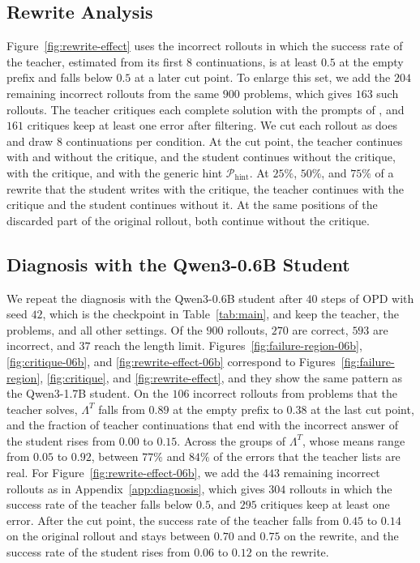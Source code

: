 \subsection{Rewrite Analysis}
\label{app:rewrite-analysis}

Figure~\ref{fig:rewrite-effect} uses the incorrect rollouts in which the success
rate of the teacher, estimated from its first $8$ continuations, is at least
$0.5$ at the empty prefix and falls below $0.5$ at a later cut point.
To enlarge this set, we add the $204$ remaining incorrect rollouts from the same
$900$ problems, which gives $163$ such rollouts.
The teacher critiques each complete solution with the prompts of \ours{}, and
$161$ critiques keep at least one error after filtering.
We cut each rollout as \ours{} does and draw $8$ continuations per condition.
At the cut point, the teacher continues with and without the critique, and the
student continues without the critique, with the critique, and with the generic
hint $\mathcal{P}_{\text{hint}}$.
At $25\%$, $50\%$, and $75\%$ of a rewrite that the student writes with the
critique, the teacher continues with the critique and the student continues
without it.
At the same positions of the discarded part of the original rollout, both
continue without the critique.

\subsection{Diagnosis with the Qwen3-0.6B Student}
\label{app:diag-06b}

We repeat the diagnosis with the Qwen3-0.6B student after $40$ steps of OPD
with seed $42$, which is the checkpoint in Table~\ref{tab:main}, and keep the
teacher, the problems, and all other settings.
Of the $900$ rollouts, $270$ are correct, $593$ are incorrect, and $37$ reach the
length limit.
Figures~\ref{fig:failure-region-06b}, \ref{fig:critique-06b}, and
\ref{fig:rewrite-effect-06b} correspond to Figures~\ref{fig:failure-region},
\ref{fig:critique}, and \ref{fig:rewrite-effect}, and they show the same
pattern as the Qwen3-1.7B student.
On the $106$ incorrect rollouts from problems that the teacher solves,
$\Lambda^T$ falls from $0.89$ at the empty prefix to $0.38$ at the last cut
point, and the fraction of teacher continuations that end with the incorrect
answer of the student rises from $0.00$ to $0.15$.
Across the groups of $\Lambda^T$, whose means range from $0.05$ to $0.92$,
between $77\%$ and $84\%$ of the errors that the teacher lists are real.
For Figure~\ref{fig:rewrite-effect-06b}, we add the $443$ remaining incorrect
rollouts as in Appendix~\ref{app:diagnosis}, which gives $304$ rollouts in which
the success rate of the teacher falls below $0.5$, and $295$ critiques keep at
least one error.
After the cut point, the success rate of the teacher falls from $0.45$ to $0.14$
on the original rollout and stays between $0.70$ and $0.75$ on the rewrite, and
the success rate of the student rises from $0.06$ to $0.12$ on the rewrite.

